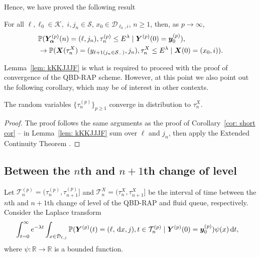 Hence, we have proved the following result 
\begin{lem}\label{lem: kKKJJJF}
	For all \(\ell,\ell_0\in\mathcal K,\) \(i,j_n\in\mathcal S\), \(x_0\in\mathcal D_{\ell_0,i}\), \(n\geq 1\), then, as \(p\to\infty\),
	\begin{align}
		&\mathbb P(\bm{Y}_{\bm{\alpha}}^{(p)}(n) = (\ell,j_n), \tau_{n}^{(p)}\leq E^{\lambda}
		\mid \boldsymbol Y^{(p)}(0)=\boldsymbol y_0^{(p)}),\nonumber 
		\\&\to \mathbb P(\boldsymbol X(\tau_n^X) = (y_{\ell+1(j_{n}\in\mathcal S_-)}, 
		j_n), \tau_{n}^X\leq E^\lambda
		\mid \boldsymbol X(0)=(x_0, i)).
	\end{align}
\end{lem} 
Lemma~\ref{lem: kKKJJJF} is what is required to proceed with the proof of convergence of the QBD-RAP scheme. However, at this point we also point out the following corollary, which may be of interest in other contexts. 
\begin{cor}
	The random variables \(\{\tau_n^{(p)}\}_{p\geq 1}\) converge in distribution to \(\tau_n^X\). 
\end{cor}
\begin{proof}
	The proof follows the same arguments as the proof of Corollary~\ref{cor: short cor} -- in Lemma~\ref{lem: kKKJJJF} sum over \(\ell\) and \(j_n\), then apply the Extended Continuity Theorem \cite[Chapter XIII, Theorem 2a]{feller1957}.
\end{proof}

\subsection{Between the \(n\)th and \(n+1\)th change of level}\label{sec: between n and np1}
Let \(\mathcal T_n^{(p)} = (\tau_{n}^{(p)},\tau_{n+1}^{(p)}]\) and \(\mathcal T_n^X=(\tau_n^X,\tau_{n+1}^X]\) be the interval of time between the \(n\)th and \(n+1\)th change of level of the QBD-RAP and fluid queue, respectively. Consider the Laplace transform 
\begin{align}
	\nonumber&\int_{t=0}^\infty e^{-\lambda t}\int_{x\in\mathcal{D}_{\ell,j}}\mathbb P({\boldsymbol Y}^{(p)}(t) = (\ell, \, \mathrm{d} x, j), t\in\mathcal T_n^{(p)} \mid 
	\boldsymbol Y^{(p)}(0)=\boldsymbol y_0^{(p)})\psi(x)\, \mathrm{d} t,
\end{align}
where \(\psi:\mathbb R\to \mathbb R\) is a bounded function. 

